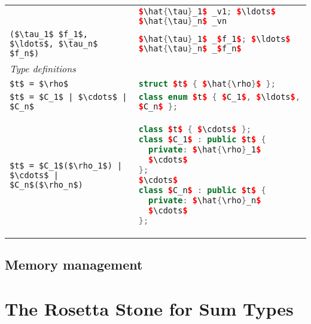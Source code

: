 \begin{table}[tp]
\begin{center}
\begin{tabular}{|p{2in}|p{3in}|}
        & \lstinline[language=c++,mathescape=true]@$\hat{\tau}_1$ _v1; $\ldots$ $\hat{\tau}_n$ _vn@ \\[0.5em]
      \lstinline[language=ASDL,mathescape=true]@($\tau_1$ $f_1$, $\ldots$, $\tau_n$ $f_n$)@
        & \lstinline[language=c++,mathescape=true]@$\hat{\tau}_1$ _$f_1$; $\ldots$ $\hat{\tau}_n$ _$f_n$@ \\[0.5em]
      \hline
      \textit{Type definitions} & \\[0.25em]
      \lstinline[language=ASDL,mathescape=true]@$t$ = $\rho$@
        & \lstinline[language=c++,mathescape=true]@struct $t$ { $\hat{\rho}$ };@ \\[0.5em]
      \lstinline[language=ASDL,mathescape=true]@$t$ = $C_1$ | $\cdots$ | $C_n$@
        & \lstinline[language=c++,mathescape=true]@class enum $t$ { $C_1$, $\ldots$, $C_n$ };@ \\[0.5em]
      \lstinline[language=ASDL,mathescape=true]@$t$ = $C_1$($\rho_1$) | $\cdots$ | $C_n$($\rho_n$)@
        &
\vspace*{-1em}
\begin{lstlisting}[language=c++,mathescape=true]
class $t$ { $\cdots$ };
class $C_1$ : public $t$ {
  private: $\hat{\rho}_1$
  $\cdots$
};
$\cdots$
class $C_n$ : public $t$ {
  private: $\hat{\rho}_n$
  $\cdots$
};
\end{lstlisting}%
      \\[0.25em]
      \hline
    \end{tabular}%
  \end{center}%
\end{table}%

\subsection{Memory management}


\section{The Rosetta Stone for Sum Types}
\label{sec:rosetta-stone}

